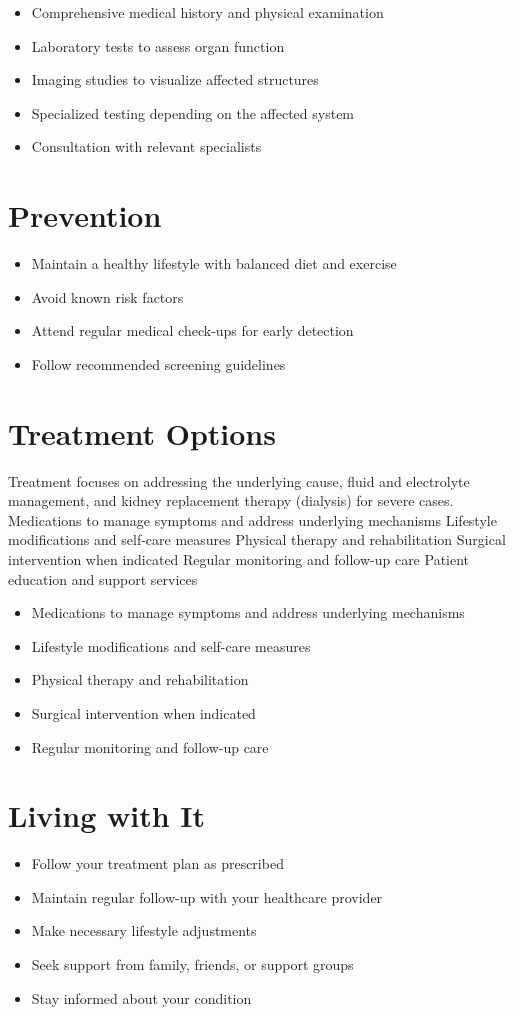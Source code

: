 \begin{itemize}[noitemsep]
  \item Comprehensive medical history and physical examination
  \item Laboratory tests to assess organ function
  \item Imaging studies to visualize affected structures
  \item Specialized testing depending on the affected system
  \item Consultation with relevant specialists
\end{itemize}
\section{Prevention}
\begin{itemize}[noitemsep]
  \item Maintain a healthy lifestyle with balanced diet and exercise
  \item Avoid known risk factors
  \item Attend regular medical check-ups for early detection
  \item Follow recommended screening guidelines
\end{itemize}
\section{Treatment Options}
Treatment focuses on addressing the underlying cause, fluid and electrolyte management, and kidney replacement therapy (dialysis) for severe cases. Medications to manage symptoms and address underlying mechanisms Lifestyle modifications and self-care measures Physical therapy and rehabilitation Surgical intervention when indicated Regular monitoring and follow-up care Patient education and support services

\begin{itemize}[noitemsep]
  \item Medications to manage symptoms and address underlying mechanisms
  \item Lifestyle modifications and self-care measures
  \item Physical therapy and rehabilitation
  \item Surgical intervention when indicated
  \item Regular monitoring and follow-up care
\end{itemize}
\section{Living with It}
\begin{itemize}[noitemsep]
  \item Follow your treatment plan as prescribed
  \item Maintain regular follow-up with your healthcare provider
  \item Make necessary lifestyle adjustments
  \item Seek support from family, friends, or support groups
  \item Stay informed about your condition
\end{itemize}

